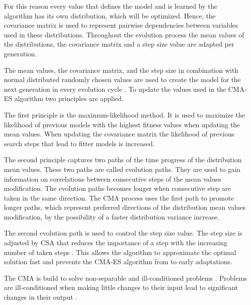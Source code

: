 For this reason every value that defines the model and is learned by the algorithm has its own distribution, which will be optimized.
Hence, the covariance matrix is used to represent pairwise dependencies between variables used in these distributions. %
Throughout the evolution process the mean values of the distributions, the covariance matrix and a step size value are adapted per generation. %

The mean values, the covariance matrix, and the step size in combination with normal distributed randomly chosen values are used to create the model for the next generation in every evolution cycle \cite{Wikipedia2017CMA-ES}.
To update the values used in the \ac{CMA-ES} algorithm two principles are applied.

The first principle is the maximum-likelihood method.
It is used to maximize the likelihood of previous models with the highest fitness values when updating the mean values.
When updating the covariance matrix the likelihood of previous search steps that lead to fitter models is increased.

The second principle captures two paths of the time progress of the distribution mean values.
These two paths are called evolution paths.
They are used to gain information on correlations between consecutive steps of the mean values modification.
The evolution paths becomes longer when consecutive step are taken in the same direction. %
The \ac{CMA} process uses the first path to promote longer paths, which represent preferred directions of the distribution mean values modification, by the possibility of a faster distribution variance increase. %

The second evolution path is used to control the step size value.
The step size is adjusted by \ac{CSA} that reduces the importance of a step with the increasing number of taken steps \cite{Chotard2012CumulativeFunctions}.
This allows the algorithm to approximate the optimal solution fast and prevents the \ac{CMA-ES} algorithm from to early adaptations. 

The \ac{CMA} is build to solve non-separable and ill-conditioned problems \cite{Hansen2011TheTutorial}.
Problems are ill-conditioned when making little changes to their input lead to significant changes in their output \cite{Wikipedia2016ConditionNumber}.

